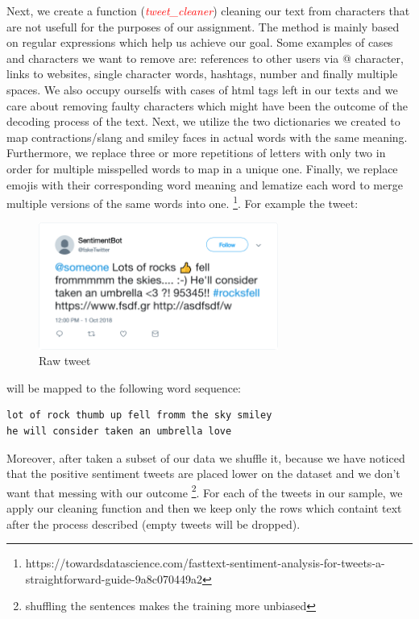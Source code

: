 \documentclass[10pt]{article}
\begin{document}
Next, we create a function (\textcolor{red}{\textit{tweet\_cleaner}}) cleaning our text from characters that are not usefull for the purposes of our assignment. The method is mainly based on regular expressions which help us achieve our goal. Some examples of cases and characters we want to remove are: references to other users via @ character, links to websites, single character words, hashtags, number and finally multiple spaces. We also occupy ourselfs with cases of html tags left in our texts and we care about removing faulty characters which might have been the outcome of the decoding process of the text. Next, we utilize the two dictionaries we created to map contractions/slang and smiley faces in actual words with the same meaning. 
Furthermore, we replace three or more repetitions of letters with only two in order for multiple misspelled words to map in a unique one. 
Finally, we replace emojis with their corresponding word meaning and lematize each word to merge multiple versions of the same words into one. 
\footnote{https://towardsdatascience.com/fasttext-sentiment-analysis-for-tweets-a-straightforward-guide-9a8c070449a2}.
For example the tweet:
\begin{figure}[H]
\centering
\caption{Raw tweet}
\includegraphics[width=0.7\textwidth]{tweet_raw.png}
\end{figure}
will be mapped to the following word sequence:
\begin{verbatim}
lot of rock thumb up fell fromm the sky smiley 
he will consider taken an umbrella love
\end{verbatim}

Moreover, after taken a subset of our data we shuffle it, because we have noticed that the positive sentiment tweets are placed lower on the dataset and we don't want that messing with our outcome \footnote{shuffling the sentences makes the training more unbiased}. For each of the tweets in our sample, we apply our cleaning function and then we keep only the rows which containt text after the process described (empty tweets will be dropped). 
\end{document}

